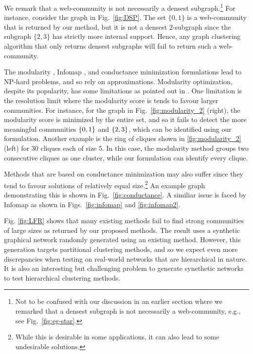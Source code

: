 We remark that a web-community is not necessarily a densest subgraph.\footnote{Not to be confused
	with our discussion in an earlier section where we remarked that a densest subgraph is not necessarily a web-community, e.g., see
	Fig.~\ref{fig:eg-star}.} 
For instance, consider the graph in Fig.~\ref{fig:DSP}.  The set $\{0,1\}$ is a web-community
that is returned by our method, but it is not a densest $2$-subgraph since the subgraph $\{2,3\}$
has strictly more internal support.  Hence, any graph clustering algorithm that only returns densest
subgraphs will fail to return such a web-community.


The modularity \cite{newman2006modularity}, Infomap \cite{rosvall2009map}, and conductance
minimization \cite{shi2000normalized} formulations lead to NP-hard problems, and so rely on
approximations.
Modularity optimization, despite its popularity, has some limitations as pointed out in
\cite{fortunato2007resolution}. One limitation is the resolution limit where the modularity score is tends to favour larger
communities. 
For instance, for the graph in Fig.~\ref{fig:modularity_2} (right), the  modularity score is
minimized by the entire set, and so it fails to detect the more meaningful communities $\{0,1\}$
and $\{2,3\}$, which can be identified using our formulation.
Another example is  the ring of cliques \cite{fortunato2007resolution} shown in \ref{fig:modularity_2} (left) for 
$30$ cliques each of size $5$. In this case, the modularity method
groups two consecutive cliques as one cluster, while our formulation can identify every clique.

Methods that are based on conductance minimization may also suffer since they tend to favour solutions of
relatively equal size.\footnote{While this is desirable in some applications, it can also lead to some
undesirable solutions.} An example graph demonstrating this is shown in Fig.~\ref{fig:conductance}.
A similiar issue is faced by Infomap as shown in Figs.~\ref{fig:infomap} and \ref{fig:infomap2}.


Fig. \ref{fig:LFR} shows that many existing methods fail to find strong communities of large sizes
as returned by our proposed methods. The result uses a synthetic graphical network randomly
generated using an existing method. However, this generation targets partitional clustering methods,
and so we expect even more discrepancies when testing on real-world networks that are hierarchical
in nature. It is also an interesting but challenging problem to generate synethetic networks to test
hierarchical clustering methods.





